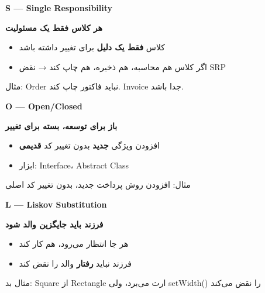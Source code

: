 \documentclass[14pt, a4paper, landscape]{extarticle}
\newcommand{\slide}[1]{%
    \newpage
    \begin{center}
    \begin{minipage}[t]{0.95\textwidth}
    \vspace{0.5cm}
    #1
    \vspace{0.5cm}
    \end{minipage}
    \end{center}
}
\newcommand{\slidetitle}[1]{%
    \begin{center}
        {\LARGE\bfseries\textcolor{primary}{#1}}
    \end{center}
    \vspace{0.5cm}
}
\newcommand{\myaccent}[1]{\textcolor{accent}{#1}}
\begin{document}
\slide{
    \slidetitle{S — Single Responsibility}
    \vspace{0.5cm}
    \begin{center}
        {\large\bfseries هر کلاس فقط یک مسئولیت}
    \end{center}
    \vspace{0.8cm}
    \begin{itemize}[itemsep=0.5em]
        \item کلاس \textbf{فقط یک دلیل} برای تغییر داشته باشد
        \item اگر کلاس هم محاسبه، هم ذخیره، هم چاپ کند → نقض SRP
    \end{itemize}
    \vspace{0.8cm}
    \begin{center}
        {\myaccent{مثال: Order نباید فاکتور چاپ کند. Invoice جدا باشد.}}
    \end{center}
}

\slide{
    \slidetitle{O — Open/Closed}
    \vspace{0.5cm}
    \begin{center}
        {\large\bfseries باز برای توسعه، بسته برای تغییر}
    \end{center}
    \vspace{0.8cm}
    \begin{itemize}[itemsep=0.5em]
        \item افزودن ویژگی \textbf{جدید} بدون تغییر کد \textbf{قدیمی}
        \item ابزار: Interface، Abstract Class
    \end{itemize}
    \vspace{0.8cm}
    \begin{center}
        {\myaccent{مثال: افزودن روش پرداخت جدید، بدون تغییر کد اصلی}}
    \end{center}
}

\slide{
    \slidetitle{L — Liskov Substitution}
    \vspace{0.5cm}
    \begin{center}
        {\large\bfseries فرزند باید جایگزین والد شود}
    \end{center}
    \vspace{0.8cm}
    \begin{itemize}[itemsep=0.5em]
        \item هر جا \lr{User} انتظار می‌رود، \lr{Admin} هم کار کند
        \item فرزند نباید \textbf{رفتار} والد را نقض کند
    \end{itemize}
    \vspace{0.8cm}
    \begin{center}
        {\myaccent{مثال بد: Square از Rectangle ارث می‌برد، ولی setWidth() 
را نقض می‌کند}}
    \end{center}
}
\end{document}
